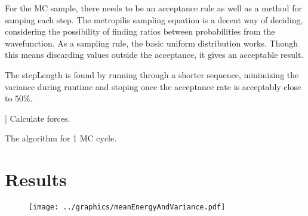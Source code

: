 \documentclass[10pt]{revtex4-1}
\begin{document}
For the MC sample, there needs to be an acceptance rule as well as a method for samping each step. The metropilis sampling equation is a decent way of deciding,
considering the possibility of finding ratios between probabilities from the wavefunction. As a sampling rule, the basic uniform distribution works.
Though this means discarding values outside the acceptance, it gives an acceptable result.

The stepLength is found by running through a shorter sequence, minimizing the variance during runtime and stoping once the acceptance rate is
acceptably close to $50\%$.
%

\begin{algorithm}
    | Calculate forces.
    \caption{The algorithm for 1 MC cycle. }
\end{algorithm}

\section{Results}


\begin{figure}[hbtp]
\texttt{[image: ../graphics/meanEnergyAndVariance.pdf]}
\caption{}
\end{figure}
\end{document}
